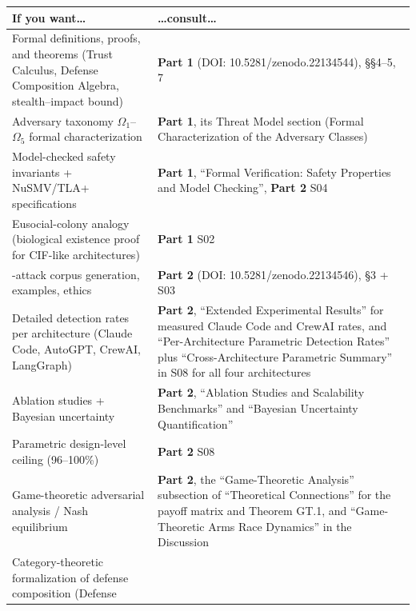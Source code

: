\documentclass[
]{article}
\newcounter{none} %
\begin{document}
{\def\LTcaptype{none} %
\begin{longtable}[]{@{}
  >{\raggedright\arraybackslash}p{}
  >{\raggedright\arraybackslash}p{}@{}}
\toprule\noalign{}
\begin{minipage}[b]{\linewidth}\raggedright
If you want\ldots{}
\end{minipage} & \begin{minipage}[b]{\linewidth}\raggedright
\ldots consult\ldots{}
\end{minipage} \\
\midrule\noalign{}
\endhead
\bottomrule\noalign{}
\endlastfoot
Formal definitions, proofs, and theorems (Trust Calculus, Defense
Composition Algebra, stealth--impact bound) & \textbf{Part 1} (DOI:
10.5281/zenodo.22134544), §§4--5, 7 \\
Adversary taxonomy \(\Omega_1\)--\(\Omega_5\) formal characterization &
\textbf{Part 1}, its Threat Model section (Formal Characterization of
the Adversary Classes) \\
Model-checked safety invariants + NuSMV/TLA+ specifications &
\textbf{Part 1}, ``Formal Verification: Safety Properties and Model
Checking'', \textbf{Part 2} S04 \\
Eusocial-colony analogy (biological existence proof for CIF-like
architectures) & \textbf{Part 1} S02 \\
950-attack corpus generation, examples, ethics & \textbf{Part 2} (DOI:
10.5281/zenodo.22134546), §3 + S03 \\
Detailed detection rates per architecture (Claude Code, AutoGPT, CrewAI,
LangGraph) & \textbf{Part 2}, ``Extended Experimental Results'' for
measured Claude Code and CrewAI rates, and ``Per-Architecture Parametric
Detection Rates'' plus ``Cross-Architecture Parametric Summary'' in S08
for all four architectures \\
Ablation studies + Bayesian uncertainty & \textbf{Part 2}, ``Ablation
Studies and Scalability Benchmarks'' and ``Bayesian Uncertainty
Quantification'' \\
Parametric design-level ceiling (96--100\%) & \textbf{Part 2} S08 \\
Game-theoretic adversarial analysis / Nash equilibrium & \textbf{Part
2}, the ``Game-Theoretic Analysis'' subsection of ``Theoretical
Connections'' for the payoff matrix and Theorem GT.1, and
``Game-Theoretic Arms Race Dynamics'' in the Discussion \\
Category-theoretic formalization of defense composition (Defense

\end{longtable}}
\end{document}
